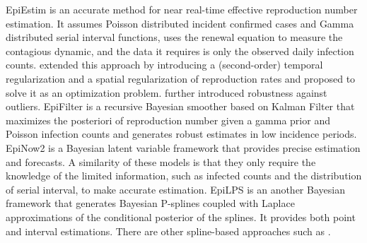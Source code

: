 EpiEstim \citep{cori2013new} is an accurate method for near real-time effective reproduction number estimation. It assumes Poisson distributed incident confirmed cases and Gamma distributed serial interval functions, uses the renewal equation to measure the contagious dynamic, and the data it requires is only the observed daily infection counts. \cite{abry2020spatial} extended this approach by introducing a (second-order) temporal regularization and a spatial regularization of reproduction rates and proposed to solve it as an optimization problem. %
\cite{pascal2022nonsmooth} further introduced robustness against outliers.
% 
EpiFilter \citep{parag2021improved} is a recursive Bayesian smoother based on Kalman Filter that maximizes the posteriori of reproduction number given a gamma prior and Poisson infection counts and generates robust estimates in low incidence periods. EpiNow2 \citep{koyama2021estimating} is a Bayesian latent variable framework that provides precise estimation and forecasts. A similarity of these models is that they only require the knowledge of the limited information, such as infected counts and the distribution of serial interval, to make accurate estimation. EpiLPS \citep{gressani2022epilps} is an another Bayesian framework that generates Bayesian P-splines coupled with Laplace approximations of the conditional posterior of the splines. It provides both point and interval estimations. 
There are other spline-based approaches such as \cite{azmon2014estimation,gressani2021approximate,pircalabelu2023spline}. %






